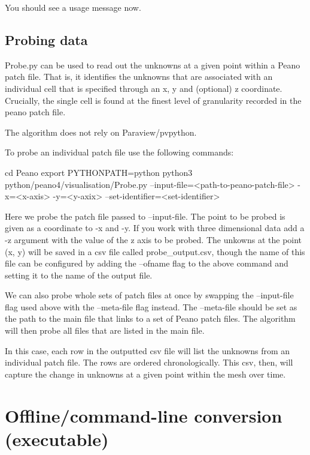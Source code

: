 \noindent
You should see a usage message now. 


\subsection{Probing data}
\label{section:postprocessing:probing}

Probe.py can be used to read out the unknowns at a given point within a Peano patch file.
That is, it identifies the unknowns that are associated with an individual cell that is
specified through an x, y and (optional) z coordinate. Crucially, the single cell is 
found at the finest level of granularity recorded in the peano patch file.

The algorithm does not rely on Paraview/pvpython.

To probe an individual patch file use the following commands:

\begin{code}
cd Peano
export PYTHONPATH=python
python3 python/peano4/visualisation/Probe.py --input-file=<path-to-peano-patch-file> 
    -x=<x-axis> -y=<y-axix> --set-identifier=<set-identifier>
\end{code}

Here we probe the patch file passed to --input-file. The point to be probed is given
as a coordinate to -x and -y. If you work with three dimensional data add a -z argument with
the value of the z axis to be probed. The unkowns at the point (x, y) will be saved in a csv
file called probe\_output.csv, though the name of this file can be configured by adding
the --ofname flag to the above command and setting it to the name of the output file.

We can also probe whole sets of patch files at once by swapping the --input-file flag
used above with the --meta-file flag instead. The --meta-file should be set as the
path to the main file that links to a set of Peano patch files. The algorithm will
then probe all files that are listed in the main file.

In this case, each row in the outputted csv file will list the unknowns from an 
individual patch file. The rows are ordered chronologically. This csv, then, 
will capture the change in unknowns at a given point within the mesh over time.


\section{Offline/command-line conversion (executable)}
\label{section:postprocessing:command-line}


